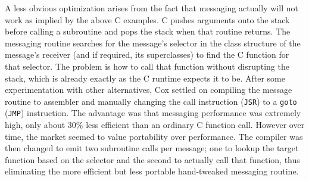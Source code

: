 \documentclass[acmsmall,screen]{acmart}
\begin{document}
A less obvious optimization arises from the fact that messaging actually will not work as implied by the above C examples. C pushes arguments onto the stack before calling a subroutine and pops the stack when that routine returns. The messaging routine searches for the message's selector in the class structure of the message's receiver (and if required, its superclasses) to find the C function for that selector. The problem is how to call that function without disrupting the stack, which is already exactly as the C runtime expects it to be. After some experimentation with other alternatives, Cox settled on compiling the message routine to assembler and manually changing the call instruction (\verb|JSR|) to a \verb|goto| (\verb|JMP|) instruction. The advantage was that messaging performance was extremely high, only about 30\% less efficient than an ordinary C function call. However over time, the market seemed to value portability over performance. The compiler was then changed to emit two subroutine calls per message; one to lookup the target function based on the selector and the second to actually call that function, thus eliminating the more efficient but less portable hand-tweaked messaging routine.
\end{document}
